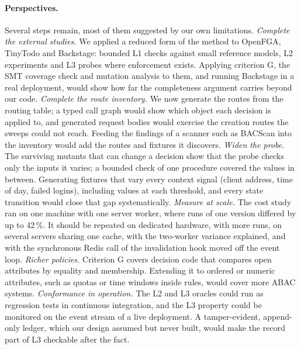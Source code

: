 \paragraph{Perspectives.} Several steps remain, most of them suggested by our own limitations.
\emph{Complete the external studies.} We applied a reduced form of the method to OpenFGA, TinyTodo and
Backstage: bounded L1 checks against small reference models, L2 experiments and L3 probes where enforcement
exists. Applying criterion G, the SMT coverage check and mutation analysis to them, and running Backstage in a
real deployment, would show how far the completeness argument carries beyond our code.
\emph{Complete the route inventory.} We now generate the routes from the routing table; a typed call graph
would show which object each decision is applied to, and generated request bodies would exercise the creation
routes the sweeps could not reach. Feeding the findings of a scanner such as BACScan \cite{liu2025bacscan} into the
inventory would add the routes and fixtures it discovers.
\emph{Widen the probe.} The surviving mutants that can change a decision show that the probe checks only the
inputs it varies; a bounded check of one procedure covered the values in between. Generating fixtures that vary
every context signal (client address, time of day, failed logins), including values at each threshold, and every
state transition would close that gap systematically.
\emph{Measure at scale.} The cost study ran on one machine with one server worker, where runs of one version
differed by up to 42\,\%. It should be repeated on dedicated hardware, with more runs, on several servers sharing
one cache, with the two-worker variance explained, and with the synchronous Redis call of the invalidation hook
moved off the event loop.
\emph{Richer policies.} Criterion G covers decision code that compares open attributes by equality and
membership. Extending it to ordered or numeric attributes, such as quotas or time windows inside rules, would
cover more ABAC systems.
\emph{Conformance in operation.} The L2 and L3 oracles could run as regression tests in continuous
integration, and the L3 property could be monitored on the event stream of a live deployment. A tamper-evident,
append-only ledger, which our design assumed but never built, would make the record part of L3 checkable after
the fact.


